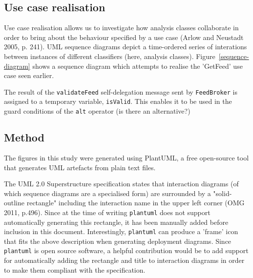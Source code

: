 \documentclass{article}
\begin{document}
\subsection{Use case realisation}



Use case realisation allows us to investigate how analysis classes collaborate in order to bring about the behaviour specified by a use case (Arlow and Neustadt 2005, p. 241). UML sequence diagrams depict a time-ordered series of interations between instances of different classifiers (here, analysis classes). Figure~\ref{sequence-diagram} shows a sequence diagram which attempts to realise the 'GetFeed' use case seen earlier.

The result of the \texttt{validateFeed} self-delegation message sent by \texttt{FeedBroker} is assigned to a temporary variable, \texttt{isValid}. This enables it to be used in the guard conditions of the \texttt{alt} operator (is there an alternative?)

\subsection{Method}

The figures in this study were generated using PlantUML, a free open-source tool\cite{plantuml} that generates UML artefacts from plain text files.

The UML 2.0 Superstructure specification states that interaction diagrams (of which sequence diagrams are a specialised form) are surrounded by a "solid-outline rectangle" including the interaction name in the upper left corner (OMG 2011, p.496). Since at the time of writing \texttt{plantuml} does not support automatically generating this rectangle, it has been manually added before inclusion in this document. Interestingly, \texttt{plantuml} can produce a 'frame' icon that fits the above description when generating deployment diagrams. Since \texttt{plantuml} is open source software, a helpful contribution would be to add support for automatically adding the rectangle and title to interaction diagrams in order to make them compliant with the specification. 
\end{document}

